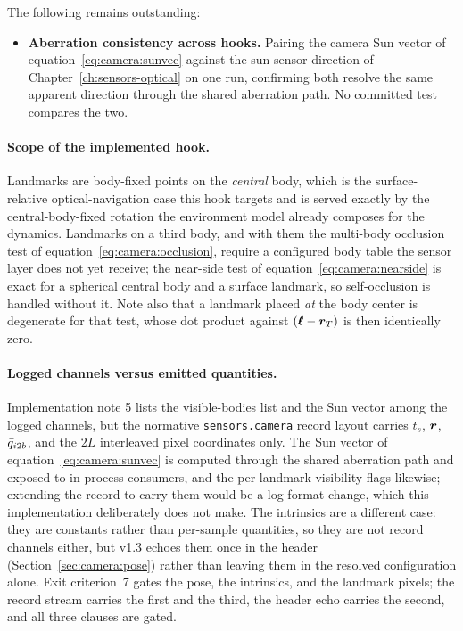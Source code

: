 The following remains outstanding:
\begin{itemize}
  \item \textbf{Aberration consistency across hooks.} Pairing the camera
    Sun vector of equation~\eqref{eq:camera:sunvec} against the sun-sensor
    direction of Chapter~\ref{ch:sensors-optical} on one run, confirming
    both resolve the same apparent direction through the shared aberration
    path. No committed test compares the two.
\end{itemize}

\paragraph{Scope of the implemented hook.} Landmarks are body-fixed points
on the \emph{central} body, which is the surface-relative
optical-navigation case this hook targets and is served exactly by the
central-body-fixed rotation the environment model already composes for the
dynamics. Landmarks on a third body, and with them the multi-body
occlusion test of equation~\eqref{eq:camera:occlusion}, require a
configured body table the sensor layer does not yet receive; the near-side
test of equation~\eqref{eq:camera:nearside} is exact for a spherical
central body and a surface landmark, so self-occlusion is handled without
it. Note also that a landmark placed \emph{at} the body center is
degenerate for that test, whose dot product against
$(\bm{\ell} - \bm{r}_T)$ is then identically zero.

\paragraph{Logged channels versus emitted quantities.} Implementation
note 5 lists the visible-bodies list and the Sun vector among the logged
channels, but the normative \texttt{sensors.camera} record layout carries
$t_s$, $\bm{r}$, $\bar{q}_{i2b}$, and the $2L$ interleaved pixel
coordinates only. The Sun vector of equation~\eqref{eq:camera:sunvec} is
computed through the shared aberration path and exposed to in-process
consumers, and the per-landmark visibility flags likewise; extending the
record to carry them would be a log-format change, which this
implementation deliberately does not make. The intrinsics are a different
case: they are constants rather than per-sample quantities, so they are
not record channels either, but v1.3 echoes them once in the header
(Section~\ref{sec:camera:pose}) rather than leaving them in the resolved
configuration alone. Exit criterion~7 gates the pose, the intrinsics, and
the landmark pixels; the record stream carries the first and the third,
the header echo carries the second, and all three clauses are gated.

